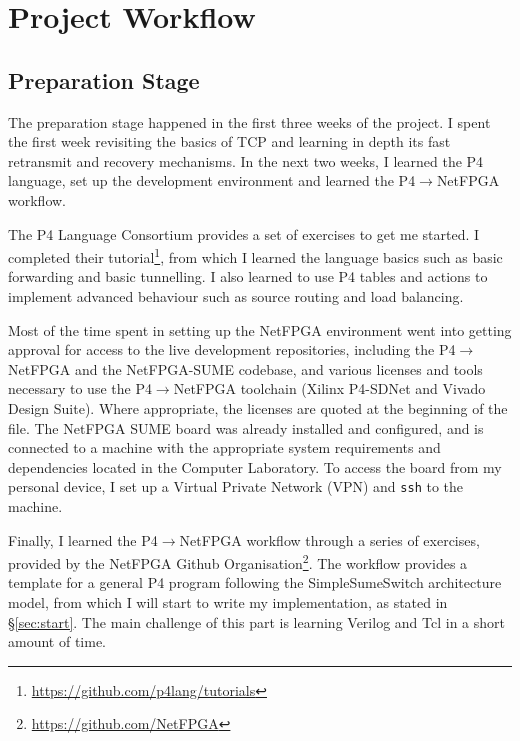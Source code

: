 \section{Project Workflow}
\label{sec:workflow}
\subsection{Preparation Stage}
The preparation stage happened in the first three weeks of the project. I spent the first week revisiting the basics of TCP and learning in depth its fast retransmit and recovery mechanisms. In the next two weeks, I learned the P4 language, set up the development environment and learned the P4$\rightarrow$NetFPGA workflow.

The P4 Language Consortium \cite{p4.org} provides a set of exercises to get me started. I completed their tutorial\footnote{\url{https://github.com/p4lang/tutorials}}, from which I learned the language basics such as basic forwarding and basic tunnelling. I also learned to use P4 tables and actions to implement advanced behaviour such as source routing and load balancing. 

Most of the time spent in setting up the NetFPGA environment went into getting approval for access to the live development repositories, including the P4$\rightarrow$NetFPGA and the NetFPGA-SUME codebase, and various licenses and tools necessary to use the P4$\rightarrow$NetFPGA toolchain (Xilinx P4-SDNet and Vivado Design Suite). Where appropriate, the licenses are quoted at the beginning of the file. The NetFPGA SUME board was already installed and configured, and is connected to a machine with the appropriate system requirements and dependencies located in the Computer Laboratory. To access the board from my personal device, I set up a Virtual Private Network (VPN) and \texttt{ssh} to the machine.

Finally, I learned the P4$\rightarrow$NetFPGA workflow through a series of exercises, provided by the NetFPGA Github Organisation\footnote{\url{https://github.com/NetFPGA}}. The workflow provides a template for a general P4 program following the SimpleSumeSwitch architecture model, from which I will start to write my implementation, as stated in \S\ref{sec:start}. The main challenge of this part is learning Verilog and Tcl in a short amount of time.

